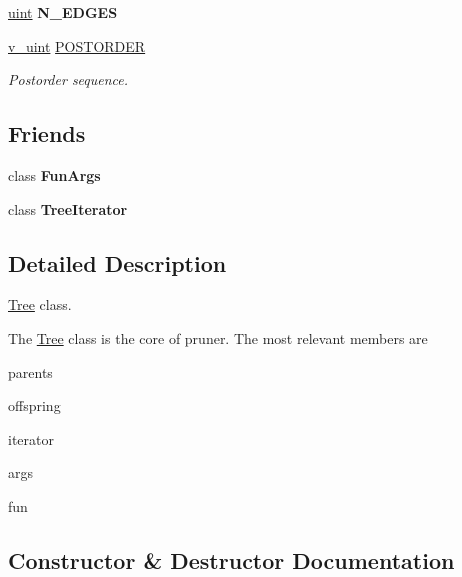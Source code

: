 \begin{DoxyCompactItemize}
\item 
\hyperlink{typedefs_8h_a91ad9478d81a7aaf2593e8d9c3d06a14}{uint} {\bfseries N\+\_\+\+E\+D\+G\+ES}\hypertarget{classTree_a123cdf871af449443aa8b7c05029d72a}{}\label{classTree_a123cdf871af449443aa8b7c05029d72a}

\item 
\hyperlink{typedefs_8h_ad56dde311aef1af823f4351451e8a381}{v\+\_\+uint} \hyperlink{classTree_a310e76b803db38e7067514822b21a58f}{P\+O\+S\+T\+O\+R\+D\+ER}
\begin{DoxyCompactList}\small\item\em Postorder sequence. \end{DoxyCompactList}\end{DoxyCompactItemize}
\subsection*{Friends}
\begin{DoxyCompactItemize}
\item 
class {\bfseries Fun\+Args}\hypertarget{classTree_a667d4fbc407b7cce57e87064b934f905}{}\label{classTree_a667d4fbc407b7cce57e87064b934f905}

\item 
class {\bfseries Tree\+Iterator}\hypertarget{classTree_a925e5a7f5dc110e63f7062d0e6898af9}{}\label{classTree_a925e5a7f5dc110e63f7062d0e6898af9}

\end{DoxyCompactItemize}


\subsection{Detailed Description}
\hyperlink{classTree}{Tree} class. 

The \hyperlink{classTree}{Tree} class is the core of pruner. The most relevant members are
\begin{DoxyItemize}
\item {\ttfamily parents}
\item {\ttfamily offspring}
\item {\ttfamily iterator}
\item {\ttfamily args}
\item {\ttfamily fun} 
\end{DoxyItemize}

\subsection{Constructor \& Destructor Documentation}

